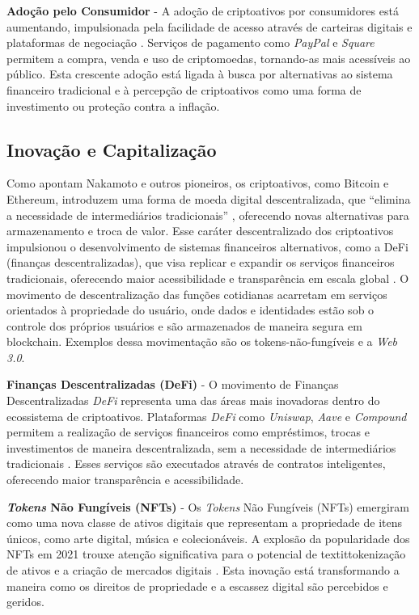 \documentclass[article,12pt,oneside,a4paper,english,brazil]{unifil}
\begin{document}
\begin{Spacing}{1.5}
\textbf{Adoção pelo Consumidor} - A adoção de criptoativos por consumidores está aumentando, impulsionada pela facilidade de acesso através de carteiras digitais e plataformas de negociação \cite{kondor2014do}. Serviços de pagamento como \textit{PayPal} e \textit{Square} permitem a compra, venda e uso de criptomoedas, tornando-as mais acessíveis ao público. Esta crescente adoção está ligada à busca por alternativas ao sistema financeiro tradicional e à percepção de criptoativos como uma forma de investimento ou proteção contra a inflação.

\subsection*{Inovação e Capitalização}

Como apontam Nakamoto e outros pioneiros, os criptoativos, como Bitcoin e Ethereum, introduzem uma forma de moeda digital descentralizada, que “elimina a necessidade de intermediários tradicionais” \cite{nakamoto2008bitcoin}, oferecendo novas alternativas para armazenamento e troca de valor. Esse caráter descentralizado dos criptoativos impulsionou o desenvolvimento de sistemas financeiros alternativos, como a DeFi (finanças descentralizadas), que visa replicar e expandir os serviços financeiros tradicionais, oferecendo maior acessibilidade e transparência em escala global \cite{schar2021defi}. O movimento de descentralização das funções cotidianas acarretam em serviços orientados à propriedade do usuário, onde dados e identidades estão sob o controle dos próprios usuários e são armazenados de maneira segura em blockchain. Exemplos dessa movimentação são os tokens-não-fungíveis e a \textit{Web 3.0}.

\textbf{Finanças Descentralizadas (DeFi)} - O movimento de Finanças Descentralizadas \textit{DeFi} representa uma das áreas mais inovadoras dentro do ecossistema de criptoativos. Plataformas \textit{DeFi} como \textit{Uniswap}, \textit{Aave} e \textit{Compound} permitem a realização de serviços financeiros como empréstimos, trocas e investimentos de maneira descentralizada, sem a necessidade de intermediários tradicionais \cite{zhang2020data}. Esses serviços são executados através de contratos inteligentes, oferecendo maior transparência e acessibilidade.

\textbf{\textit{Tokens} Não Fungíveis (NFTs)} - Os \textit{Tokens} Não Fungíveis (NFTs) emergiram como uma nova classe de ativos digitais que representam a propriedade de itens únicos, como arte digital, música e colecionáveis. A explosão da popularidade dos NFTs em 2021 trouxe atenção significativa para o potencial de textit{tokenização} de ativos e a criação de mercados digitais \cite{wang2021non}. Esta inovação está transformando a maneira como os direitos de propriedade e a escassez digital são percebidos e geridos.


\end{Spacing}
\end{document}
